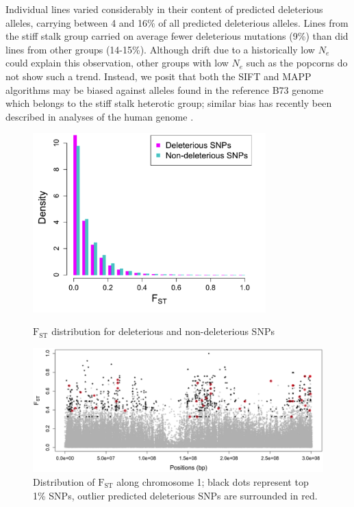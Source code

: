 \documentclass[12pt]{article}
\begin{document}
Individual lines varied considerably in their content of predicted deleterious alleles, carrying between 4 and 16\% of all predicted deleterious alleles. Lines from the stiff stalk group carried on average fewer deleterious mutations (9\%) than did lines from other groups (14-15\%).  Although drift due to a  historically low $N_{e}$ \citep{Messmer1991} could explain this observation, other groups with low $N_{e}$ such as the popcorns do not show such a trend.  Instead, we posit that both the SIFT and MAPP algorithms may be biased against alleles found in the reference B73 genome which belongs to the stiff stalk heterotic group; similar bias has recently been described in analyses of the human genome \citep{Simons2013}.

\begin{figure}[!t]
  \begin{center}
   \includegraphics[width=90mm]{Fst.png}
    \caption{$\mathrm{F}_{\mathrm{ST}}$ distribution for deleterious and non-deleterious SNPs}
   \label{fst_dist}
  \end{center}
  \begin{center}
   \includegraphics[width=150mm]{Fst2.png}
    \caption{Distribution of $\mathrm{F}_{\mathrm{ST}}$ along chromosome 1; black dots represent top 1\% SNPs, outlier predicted deleterious SNPs are surrounded in red.} 
   \label{fst_chr1}
  \end{center}
\end{figure}
\end{document}
